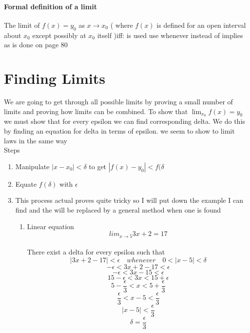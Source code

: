 \documentclass[12pt, a4paper,oneside]{book}
\begin{document}
\paragraph{Formal definition of a limit} \begin{paragraph} The limit of $f(x)=y_0$ as ${x \to x_0}$ ( where $f(x)$ is defined for an open interval about $x_0$ except possibly at $x_0$ itself )iff:  is used  use whenever instead of implies as is done on page 80\end{paragraph}
\section{Finding Limits}
	\begin{paragraph}
		We are going to get through all possible limits by proving a small number of limits and proving how 		limits can be combined.
		To show that \(\lim_{x_0}f(x)=y_0\) we must show that for every epsilon we can find corresponding 			delta. We do this by finding an equation for delta in terms of epsilon. we seem to show to limit laws 			in the same way\\ 
		Steps \begin{enumerate}
				\item{Manipulate \( |x-x_0|<\delta\) to get \(|f(x)-y_0|<f(\delta\) }
				\item{Equate \(f(\delta)\) with \(\epsilon\)}
				\item{This process actual proves quite tricky so I will put down the example I can find and the 				will be replaced by a general method when one is found
					\begin{enumerate}
						\item{Linear equation \[lim_{x\to 5} 3x+2 = 17\] \\
						There exist a delta for every epsilon such that 
						\[|3x+2-17|<\epsilon \quad whenever \quad 0<|x-5|<\delta\]
						\[-\epsilon<3x+2-17<\epsilon\] \[-\epsilon<3x-15<\epsilon\]
						\[15-\epsilon<3x< 15+ \epsilon\] 
						\[5-\frac{\epsilon}{3}<x<5+\frac{\epsilon}{3}\] 
						\[\frac{\epsilon}{3}<x-5<\frac{\epsilon}{3}\] 
						\[|x-5|<\frac{\epsilon}{3}\] \[\delta = \frac{\epsilon}{3}\]} 
				\end{enumerate}}
			\end{enumerate}
	\end{paragraph}
	
\end{document}
